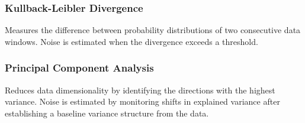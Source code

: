 \subsubsection{Kullback-Leibler Divergence}
Measures the difference between probability distributions of two consecutive data windows. Noise is estimated when the divergence exceeds a threshold.

\subsubsection{Principal Component Analysis}
Reduces data dimensionality by identifying the directions with the highest variance. Noise is estimated by monitoring shifts in explained variance after establishing a baseline variance structure from the data.










